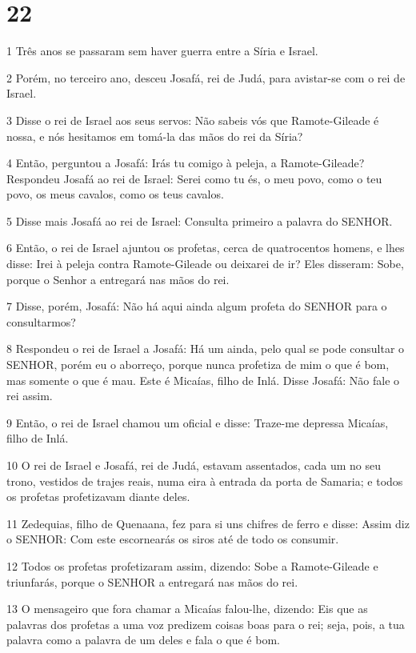 \chapter{22}

\par 1 Três anos se passaram sem haver guerra entre a Síria e Israel.
\par 2 Porém, no terceiro ano, desceu Josafá, rei de Judá, para avistar-se com o rei de Israel.
\par 3 Disse o rei de Israel aos seus servos: Não sabeis vós que Ramote-Gileade é nossa, e nós hesitamos em tomá-la das mãos do rei da Síria?
\par 4 Então, perguntou a Josafá: Irás tu comigo à peleja, a Ramote-Gileade? Respondeu Josafá ao rei de Israel: Serei como tu és, o meu povo, como o teu povo, os meus cavalos, como os teus cavalos.
\par 5 Disse mais Josafá ao rei de Israel: Consulta primeiro a palavra do SENHOR.
\par 6 Então, o rei de Israel ajuntou os profetas, cerca de quatrocentos homens, e lhes disse: Irei à peleja contra Ramote-Gileade ou deixarei de ir? Eles disseram: Sobe, porque o Senhor a entregará nas mãos do rei.
\par 7 Disse, porém, Josafá: Não há aqui ainda algum profeta do SENHOR para o consultarmos?
\par 8 Respondeu o rei de Israel a Josafá: Há um ainda, pelo qual se pode consultar o SENHOR, porém eu o aborreço, porque nunca profetiza de mim o que é bom, mas somente o que é mau. Este é Micaías, filho de Inlá. Disse Josafá: Não fale o rei assim.
\par 9 Então, o rei de Israel chamou um oficial e disse: Traze-me depressa Micaías, filho de Inlá.
\par 10 O rei de Israel e Josafá, rei de Judá, estavam assentados, cada um no seu trono, vestidos de trajes reais, numa eira à entrada da porta de Samaria; e todos os profetas profetizavam diante deles.
\par 11 Zedequias, filho de Quenaana, fez para si uns chifres de ferro e disse: Assim diz o SENHOR: Com este escornearás os siros até de todo os consumir.
\par 12 Todos os profetas profetizaram assim, dizendo: Sobe a Ramote-Gileade e triunfarás, porque o SENHOR a entregará nas mãos do rei.
\par 13 O mensageiro que fora chamar a Micaías falou-lhe, dizendo: Eis que as palavras dos profetas a uma voz predizem coisas boas para o rei; seja, pois, a tua palavra como a palavra de um deles e fala o que é bom.

